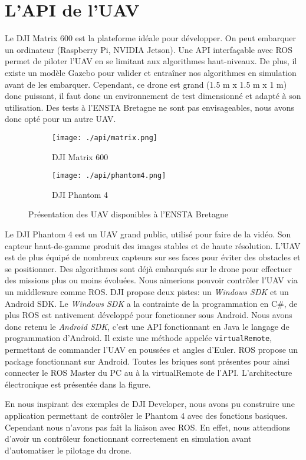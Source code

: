 \section{L'API de l'UAV}

Le DJI Matrix 600 est la plateforme idéale pour développer. On peut embarquer un
ordinateur (Raspberry Pi, NVIDIA Jetson). Une API interfaçable avec ROS permet de
piloter l’UAV en se limitant aux algorithmes haut-niveaux. De plus, il existe un modèle
Gazebo pour valider et entraîner nos algorithmes en simulation avant de les embarquer.
Cependant, ce drone est grand (1.5 m x 1.5 m x 1 m) donc puissant, il faut donc un
environnement de test dimensionné et adapté à son utilisation. Des tests à l’ENSTA
Bretagne ne sont pas envisageables, nous avons donc opté pour un autre UAV. 

\begin{figure}[!htb]
    \centering
    \begin{subfigure}[b]{0.4\textwidth}
        \centering
        \texttt{[image: ./api/matrix.png]}
        \caption{DJI Matrix 600}
        \label{fig:marker}
    \end{subfigure}
    \hfill
    \begin{subfigure}[b]{0.4\textwidth}
        \centering
        \texttt{[image: ./api/phantom4.png]}
        \caption{DJI Phantom 4}
        \label{fig:manifold}
    \end{subfigure}
    \caption{Présentation des UAV disponibles à l'ENSTA Bretagne}
    \label{fig:environnement}
\end{figure}

Le DJI Phantom 4 est un UAV grand public, utilisé pour faire de la vidéo. Son capteur
haut-de-gamme produit des images stables et de haute résolution. L’UAV est de plus
équipé de nombreux capteurs sur ses faces pour éviter des obstacles et se positionner.
Des algorithmes sont déjà embarqués sur le drone pour effectuer des missions plus ou
moins évoluées. Nous aimerions pouvoir contrôler l’UAV via un middleware comme
ROS. DJI propose deux pistes: un \textit{Windows SDK} et un Android SDK. Le \textit{Windows SDK}
a la contrainte de la programmation en C\#, de plus ROS est nativement développé pour
fonctionner sous Android. Nous avons donc retenu le \textit{Android SDK}, c’est une API
fonctionnant en Java le langage de programmation d’Android. Il existe une méthode
appelée \texttt{virtualRemote}, permettant de commander l’UAV en poussées et angles
d’Euler.
ROS propose un package fonctionnant sur Android. Toutes les briques sont présentes
pour ainsi connecter le ROS Master du PC au à la virtualRemote de l’API. L’architecture
électronique est présentée dans la figure.

En nous inspirant des exemples de DJI Developer, nous avons pu construire une
application permettant de contrôler le Phantom 4 avec des fonctions basiques.
Cependant nous n’avons pas fait la liaison avec ROS. En effet, nous attendions d’avoir
un contrôleur fonctionnant correctement en simulation avant d’automatiser le pilotage
du drone.

